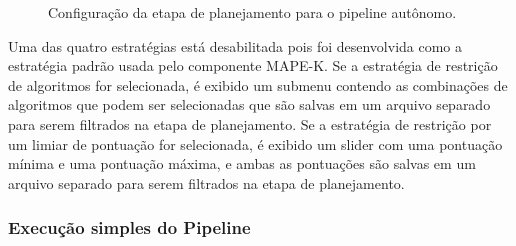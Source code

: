 \documentclass[portugues]{ic-tese}
\begin{document}
\begin{figure}[H]
    \centering
    \caption{Configuração da etapa de planejamento para o pipeline autônomo.}
    \label{fig:configPlanejamento}
\end{figure}

Uma das quatro estratégias está desabilitada pois foi desenvolvida como a estratégia padrão usada pelo componente MAPE-K. Se a estratégia de restrição de algoritmos for selecionada, é exibido um submenu contendo as combinações de algoritmos que podem ser selecionadas que são salvas em um arquivo separado para serem filtrados na etapa de planejamento. Se a estratégia de restrição por um limiar de pontuação for selecionada, é exibido um slider com uma pontuação mínima e uma pontuação máxima, e ambas as pontuações são salvas em um arquivo separado para serem filtrados na etapa de planejamento.

\subsubsection{Execução simples do Pipeline}
\end{document}
